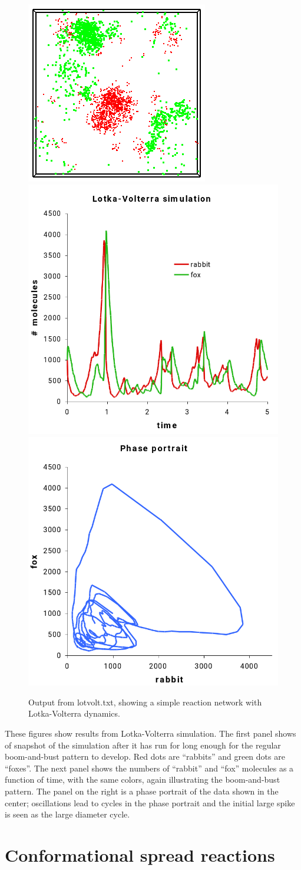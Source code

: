 \documentclass {book}
\begin{document}
\begin{figure}[h]
\centering
\includegraphics[height=5 cm]{figures/image53}
\includegraphics[height=5 cm]{figures/image54}
\includegraphics[height=5 cm]{figures/image55}
\caption{Output from lotvolt.txt, showing a simple reaction network with Lotka-Volterra dynamics.}
\label{fig:lotvolt}
\end{figure}

These figures show results from Lotka-Volterra simulation. The first panel shows of snapshot of the simulation after it has run for long enough for the regular boom-and-bust pattern to develop. Red dots are ``rabbits'' and green dots are ``foxes''. The next panel shows the numbers of ``rabbit'' and ``fox'' molecules as a function of time, with the same colors, again illustrating the boom-and-bust pattern. The panel on the right is a phase portrait of the data shown in the center; oscillations lead to cycles in the phase portrait and the initial large spike is seen as the large diameter cycle.

\section{Conformational spread reactions}
\end{document}
